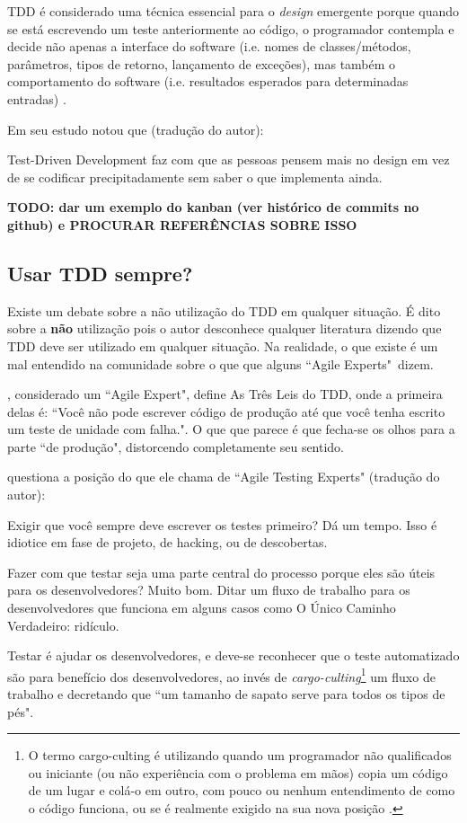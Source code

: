 TDD é considerado uma técnica essencial para o \textit{design} emergente porque
quando se está escrevendo um teste anteriormente ao código, o programador contempla e decide não apenas a interface do software (i.e. nomes de classes/métodos, parâmetros, tipos de retorno, lançamento de exceções), mas também o comportamento do software (i.e. resultados esperados para determinadas entradas) \cite{JanzenTDD}.

Em seu estudo \cite{DammTDD} notou que (tradução do autor):

\begin{citacao}
Test-Driven Development faz com que as pessoas pensem mais no design em vez de se codificar precipitadamente sem saber o que implementa ainda.
\end{citacao}

\textbf{TODO: dar um exemplo do kanban (ver histórico de commits no github) e PROCURAR REFERÊNCIAS SOBRE ISSO}


\subsection{Usar TDD sempre?} %
\label{sec:usar_tdd_sempre}

Existe um debate sobre a não utilização do TDD em qualquer situação. É dito sobre a \textbf{não} utilização pois o autor desconhece qualquer literatura dizendo que TDD deve ser utilizado em qualquer situação. Na realidade, o que existe é um mal entendido na comunidade sobre o que que alguns ``Agile Experts"\ dizem.

, considerado um ``Agile Expert", define As Três Leis do TDD, onde a primeira delas é: ``Você não pode escrever código de produção até que você tenha escrito um teste de unidade com falha.". O que que parece é que fecha-se os olhos para a parte ``de produção", distorcendo completamente seu sentido.

 questiona a posição do que ele chama de ``Agile Testing Experts" (tradução do autor):

\begin{citacao}
Exigir que você sempre deve escrever os testes primeiro? Dá um tempo. Isso é idiotice em fase de projeto, de hacking, ou de descobertas.

Fazer com que testar seja uma parte central do processo porque eles são úteis para os desenvolvedores? Muito bom. Ditar um fluxo de trabalho para os desenvolvedores que funciona em alguns casos como O Único Caminho Verdadeiro: ridículo.

Testar é ajudar os desenvolvedores, e deve-se reconhecer que o teste automatizado são para benefício dos desenvolvedores, ao invés de \textit{cargo-culting}\footnote{O termo cargo-culting é utilizando quando um programador não qualificados ou iniciante (ou não experiência com o problema em mãos) copia um código de um lugar e colá-o em outro, com pouco ou nenhum entendimento de como o código funciona, ou se é realmente exigido na sua nova posição \cite{CargoCulting}.} um fluxo de trabalho e decretando que ``um tamanho de sapato serve para todos os tipos de pés".
\end{citacao}

